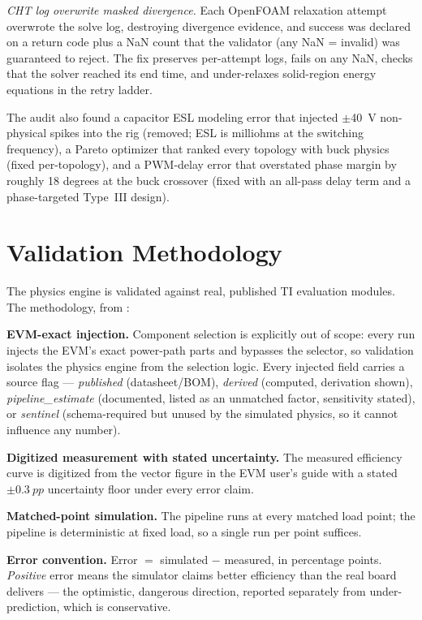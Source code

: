 \documentclass[conference]{IEEEtran}
\begin{document}
\emph{CHT log overwrite masked divergence.} Each OpenFOAM relaxation
attempt overwrote the solve log, destroying divergence evidence, and
success was declared on a return code plus a NaN count that the
validator (any NaN = invalid) was guaranteed to reject. The fix
preserves per-attempt logs, fails on any NaN, checks that the solver
reached its end time, and under-relaxes solid-region energy equations
in the retry ladder.

The audit also found a capacitor ESL modeling error that injected
$\pm$40~V non-physical spikes into the rig (removed; ESL is
milliohms at the switching frequency), a Pareto optimizer that ranked
every topology with buck physics (fixed per-topology), and a
PWM-delay error that overstated phase margin by roughly 18 degrees at
the buck crossover (fixed with an all-pass delay term and a
phase-targeted Type~III design).

\section{Validation Methodology}
\label{sec:method}

The physics engine is validated against real, published TI evaluation
modules. The methodology, from \cite{valreport}:

\textbf{EVM-exact injection.} Component selection is explicitly out of
scope: every run injects the EVM's exact power-path parts and bypasses
the selector, so validation isolates the physics engine from the
selection logic. Every injected field carries a source flag ---
\emph{published} (datasheet/BOM), \emph{derived} (computed, derivation
shown), \emph{pipeline\_estimate} (documented, listed as an unmatched
factor, sensitivity stated), or \emph{sentinel} (schema-required but
unused by the simulated physics, so it cannot influence any number).

\textbf{Digitized measurement with stated uncertainty.} The measured
efficiency curve is digitized from the vector figure in the EVM user's
guide with a stated $\pm\SI{0.3}{pp}$ uncertainty floor under every
error claim.

\textbf{Matched-point simulation.} The pipeline runs at every matched
load point; the pipeline is deterministic at fixed load, so a single
run per point suffices.

\textbf{Error convention.} Error $=$ simulated $-$ measured, in
percentage points. \emph{Positive} error means the simulator claims
better efficiency than the real board delivers --- the optimistic,
dangerous direction, reported separately from under-prediction, which
is conservative.
\end{document}
